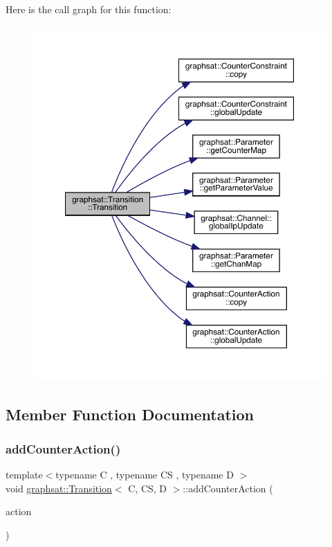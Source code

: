 Here is the call graph for this function\+:
\nopagebreak
\begin{figure}[H]
\begin{center}
\leavevmode
\includegraphics[width=350pt]{classgraphsat_1_1_transition_a6324e36409a36829cdc25b53c5ee332d_cgraph}
\end{center}
\end{figure}


\subsection{Member Function Documentation}
\mbox{\label{classgraphsat_1_1_transition_a8b25340523019a7995e5d77b112bf37f}} 
\subsubsection{\texorpdfstring{addCounterAction()}{addCounterAction()}}
{\footnotesize\ttfamily template$<$typename C , typename CS , typename D $>$ \\
void \mbox{\hyperlink{classgraphsat_1_1_transition}{graphsat\+::\+Transition}}$<$ C, CS, D $>$\+::add\+Counter\+Action (\begin{DoxyParamCaption}\item[{const \mbox{\hyperlink{classgraphsat_1_1_counter_action}{Counter\+Action}} $\ast$}]{action }\end{DoxyParamCaption})\hspace{0.3cm}{\ttfamily [inline]}}


